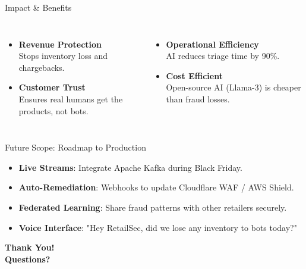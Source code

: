 \documentclass[aspectratio=169]{beamer}
\begin{document}
\begin{frame}{Impact \& Benefits}
    \begin{columns}
        \begin{itemize}
            \item \textbf{Revenue Protection}\\ Stops inventory loss and chargebacks.
            \item \textbf{Customer Trust}\\ Ensures real humans get the products, not bots.
        \end{itemize}
        
        \begin{itemize}
            \item \textbf{Operational Efficiency}\\ AI reduces triage time by 90\%.
            \item \textbf{Cost Efficient}\\ Open-source AI (Llama-3) is cheaper than fraud losses.
        \end{itemize}
    \end{columns}
\end{frame}

\begin{frame}{Future Scope: Roadmap to Production}
    \begin{itemize}
        \item \textbf{Live Streams}: Integrate Apache Kafka during Black Friday.
        \item \textbf{Auto-Remediation}: Webhooks to update Cloudflare WAF / AWS Shield.
        \item \textbf{Federated Learning}: Share fraud patterns with other retailers securely.
        \item \textbf{Voice Interface}: "Hey RetailSec, did we lose any inventory to bots today?"
    \end{itemize}
\end{frame}



\begin{frame}
    \centering
    \Huge\bfseries Thank You!\\
    \large Questions?
\end{frame}
\end{document}
